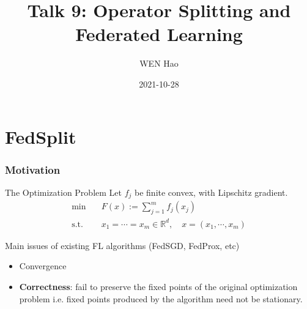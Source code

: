 


\title[]{Talk 9: Operator Splitting and Federated Learning}
\date{2021-10-28}
\author[]{WEN Hao}




\setlength{\belowdisplayskip}{5pt} \setlength{\belowdisplayshortskip}{5pt}
\setlength{\abovedisplayskip}{5pt} \setlength{\abovedisplayshortskip}{5pt}


\begin{frame}
\titlepage %
\end{frame}


\section{FedSplit}


\begin{frame}
\frametitle{Motivation}

\begin{block}{The Optimization Problem}
Let $f_j$ be finite convex, with Lipschitz gradient.
\vspace{-1em}
\begin{align*}
    \text{min} & \quad F(x) := \sum_{j=1}^m f_j(x_j) \\
    \text{s.t.} & \quad x_1 = \cdots = x_m \in \mathbb{R}^d, \quad x = (x_1, \cdots, x_m)
\end{align*}
\end{block}

Main issues of existing FL algorithms (FedSGD, FedProx, etc)

\begin{itemize}
    \item Convergence
    \item {\bf Correctness}: fail to preserve the fixed points of the original optimization problem i.e. fixed points produced by the algorithm need not be stationary.
\end{itemize}


\end{frame}

